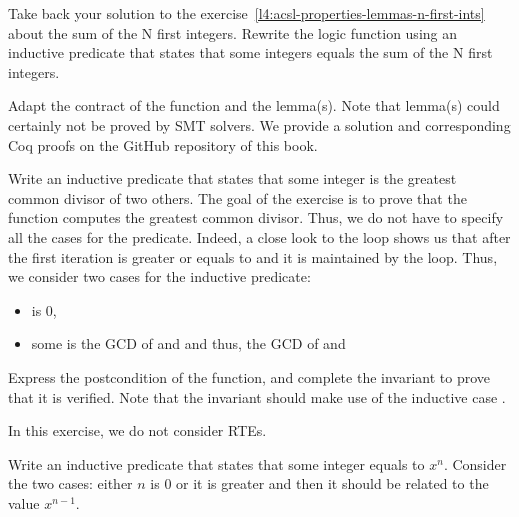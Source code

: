 



Take back your solution to the
exercise~\ref{l4:acsl-properties-lemmas-n-first-ints} about the sum of the N
first integers. Rewrite the logic function using an inductive predicate that
states that some integers equals the sum of the N first integers.




Adapt the contract of the function and the lemma(s). Note that lemma(s) could
certainly not be proved by SMT solvers. We provide a solution and corresponding
Coq proofs on the GitHub repository of this book.




Write an inductive predicate that states that some integer is the greatest common
divisor of two others. The goal of the exercise is to prove that the function
 computes the greatest common divisor. Thus, we do not have to
specify all the cases for the predicate. Indeed, a close look to the loop shows
us that after the first iteration  is greater or equals to
 and it is maintained by the loop. Thus, we consider two cases for
the inductive predicate:


\begin{itemize}
\item {} is 0,
\item some  is the GCD of  and  and
  thus, the GCD of  and 
\end{itemize}




Express the postcondition of the function, and complete the invariant to prove
that it is verified. Note that the invariant should make use of the inductive
case .





In this exercise, we do not consider RTEs.


Write an inductive predicate that states that some integer  equals
to $x^n$. Consider the two cases: either $n$ is 0 or it is greater and then it
should be related to the value $x^{n-1}$.




